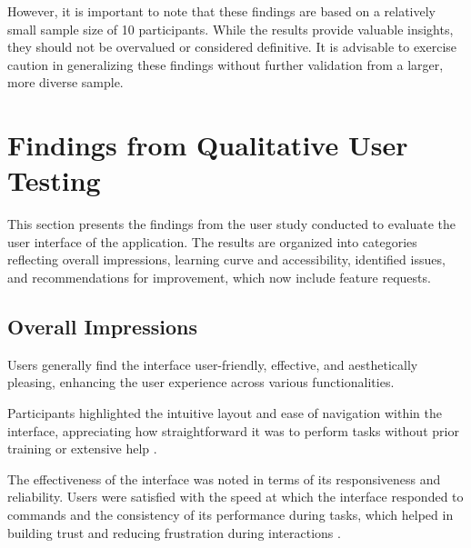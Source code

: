 However, it is important to note that these findings are based on a relatively small sample size of 10 participants.
While the results provide valuable insights, they should not be overvalued or considered definitive.
It is advisable to exercise caution in generalizing these findings without further validation from a larger, more diverse sample.

\section{Findings from Qualitative User Testing}
\label{sec:result:qualitative}

This section presents the findings from the user study conducted to evaluate the user interface of the application.
The results are organized into categories reflecting overall impressions, learning curve and accessibility, identified issues, and recommendations for improvement, which now include feature requests.

\subsection*{Overall Impressions}
\label{sec:results:overall_impressions}

Users generally find the interface user-friendly, effective, and aesthetically pleasing, enhancing the user experience across various functionalities. 

Participants highlighted the intuitive layout and ease of navigation within the interface, appreciating how straightforward it was to perform tasks without prior training or extensive help \cite{P1, P2, P4, P5, P7, P8, P10}.

 
The effectiveness of the interface was noted in terms of its responsiveness and reliability. 
Users were satisfied with the speed at which the interface responded to commands and the consistency of its performance during tasks, which helped in building trust and reducing frustration during interactions \cite{P2, P4, P7, P8, P10}.




